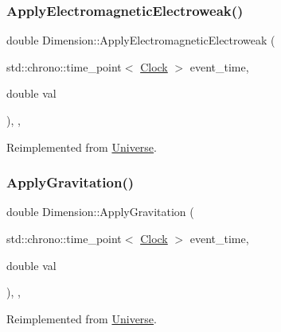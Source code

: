 \subsubsection{\texorpdfstring{Apply\+Electromagnetic\+Electroweak()}{ApplyElectromagneticElectroweak()}}
{\footnotesize\ttfamily double Dimension\+::\+Apply\+Electromagnetic\+Electroweak (\begin{DoxyParamCaption}\item[{std\+::chrono\+::time\+\_\+point$<$ \mbox{\hyperlink{universe_8h_a0ef8d951d1ca5ab3cfaf7ab4c7a6fd80}{Clock}} $>$}]{event\+\_\+time,  }\item[{double}]{val }\end{DoxyParamCaption})\hspace{0.3cm}{\ttfamily [inline]}, {\ttfamily [final]}, {\ttfamily [virtual]}}



Reimplemented from \mbox{\hyperlink{classUniverse_a4c36c1ab30db993307f88363dde5e8c5}{Universe}}.

\mbox{\label{classDimension_a9474b0dd3f6321a92bfe4375bb4b2266}} 
\subsubsection{\texorpdfstring{Apply\+Gravitation()}{ApplyGravitation()}}
{\footnotesize\ttfamily double Dimension\+::\+Apply\+Gravitation (\begin{DoxyParamCaption}\item[{std\+::chrono\+::time\+\_\+point$<$ \mbox{\hyperlink{universe_8h_a0ef8d951d1ca5ab3cfaf7ab4c7a6fd80}{Clock}} $>$}]{event\+\_\+time,  }\item[{double}]{val }\end{DoxyParamCaption})\hspace{0.3cm}{\ttfamily [inline]}, {\ttfamily [final]}, {\ttfamily [virtual]}}



Reimplemented from \mbox{\hyperlink{classUniverse_a76c0b5e63c2a7d1988c44db341c3d64c}{Universe}}.

\mbox{\label{classDimension_a621e8f7f24db86e836c5b3da0f019290}} 
